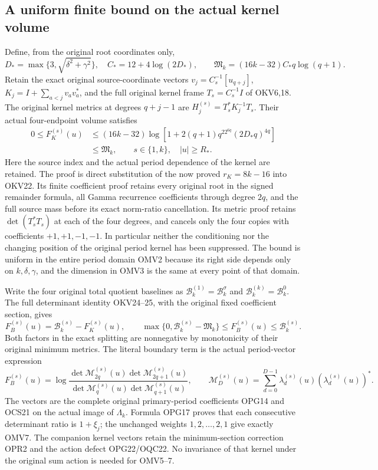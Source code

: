 \documentclass[11pt,a4paper]{article}
\begin{document}
\subsection{A uniform finite bound on the actual kernel volume}
Define, from the original root coordinates only,
\[
 D_*=\max\{3,\sqrt{\delta^2+\gamma^2}\},\quad
 C_*=12+4\log(2D_*),\qquad
 \mathfrak M_k=(16k-32)C_*q\log(q+1).
 \tag{OMV4}
\]
Retain the exact original source-coordinate vectors
$v_j=C_s^{-1}[u_{q+j}]$, $K_j=I+\sum_{a<j}v_av_a^*$,
and the full original kernel frame $T_s=C_s^{-1}I$ of OKV6,18.
The original kernel metrics at degrees $q+j-1$ are
$H_j^{(s)}=T_s^*K_j^{-1}T_s$. Their actual four-endpoint volume
satisfies
\[
 \boxed{\begin{aligned}
 0\leq F_K^{(s)}(u)
 &\leq(16k-32)\log\!\left[
       1+2(q+1)q^22^{6q}(2D_*q)^{4q}\right]\\
 &\leq\mathfrak M_k,
 \qquad s\in\{1,k\},\quad |u|\geq R_*.
 \end{aligned}}\tag{OMV5}
\]
Here the source index and the actual period dependence of the kernel
are retained. The proof is direct substitution of the now proved
$r_K=8k-16$ into OKV22. Its finite coefficient proof retains
every original root in the signed remainder formula, all Gamma
recurrence coefficients through degree $2q$, and the full source
mass before its exact norm-ratio cancellation. Its metric proof
retains $\det(T_s^*T_s)$ at each of the four degrees, and cancels
only the four copies with coefficients $+1,+1,-1,-1$.
In particular neither the conditioning nor the changing position
of the original period kernel has been suppressed. The bound is
uniform in the entire period domain OMV2 because its right side
depends only on $k,\delta,\gamma$, and the dimension in OMV3 is
the same at every point of that domain.

Write the four original total quotient baselines as
$\mathcal B_k^{(1)}=\mathcal B_k^\sigma$ and
$\mathcal B_k^{(k)}=\mathcal B_k^0$. The full determinant identity
OKV24--25, with the original fixed coefficient section, gives
\[
 F_B^{(s)}(u)=\mathcal B_k^{(s)}-F_K^{(s)}(u),\qquad
 \max\{0,\mathcal B_k^{(s)}-\mathfrak M_k\}
           \leq F_B^{(s)}(u)\leq\mathcal B_k^{(s)}.
 \tag{OMV6}
\]
Both factors in the exact splitting are nonnegative by monotonicity
of their original minimum metrics. The literal boundary term is
the actual period-vector expression
\[
 F_B^{(s)}(u)=\log\frac{
       \det\mathcal M_{2q}^{(s)}(u)\det\mathcal M_{2q+1}^{(s)}(u)}{
       \det\mathcal M_q^{(s)}(u)\det\mathcal M_{q+1}^{(s)}(u)},
 \qquad
 \mathcal M_D^{(s)}(u)=\sum_{d=0}^{D-1}
       \lambda_d^{(s)}(u)(\lambda_d^{(s)}(u))^*.
 \tag{OMV7}
\]
The vectors are the complete original primary-period coefficients
OPG14 and OCS21 on the actual image of $\Lambda_k$. Formula OPG17
proves that each consecutive determinant ratio is $1+\xi_j$;
the unchanged weights $1,2,\ldots,2,1$ give exactly OMV7.
The companion kernel vectors retain the minimum-section correction
OPR2 and the action defect OPG22/OQC22. No invariance of that kernel
under the original sum action is needed for OMV5--7.
\end{document}
